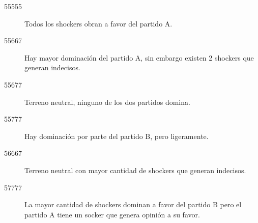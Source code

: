 \begin{description}
    \item[55555] Todos los shockers obran a favor del partido A.
    \item[55667] Hay mayor dominación del partido A, sin embargo existen 2 shockers que generan indecisos.
    \item[55677] Terreno neutral, ninguno de los dos partidos domina.
    \item[55777] Hay dominación por parte del partido B, pero ligeramente.
    \item[56667] Terreno neutral con mayor cantidad de shockers que generan indecisos.
    \item[57777] La mayor cantidad de shockers dominan a favor del partido B pero el partido A tiene un socker que genera opinión a su favor.
\end{description}

